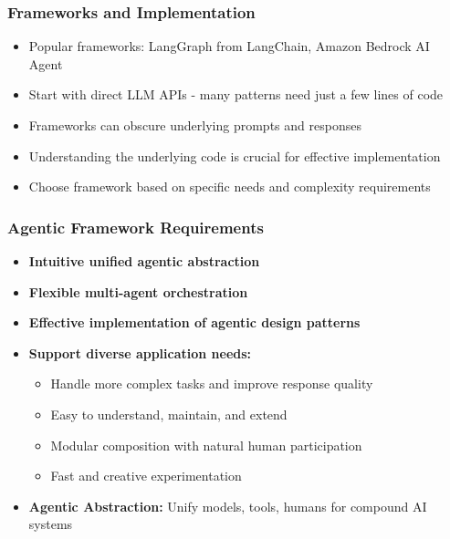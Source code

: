 \begin{frame}[fragile]\frametitle{Frameworks and Implementation}
\begin{itemize}
    \item Popular frameworks: LangGraph from LangChain, Amazon Bedrock AI Agent
    \item Start with direct LLM APIs - many patterns need just a few lines of code
    \item Frameworks can obscure underlying prompts and responses
    \item Understanding the underlying code is crucial for effective implementation
    \item Choose framework based on specific needs and complexity requirements
\end{itemize}
\end{frame}

\begin{frame}[fragile]\frametitle{Agentic Framework Requirements}
\begin{itemize}
    \item \textbf{Intuitive unified agentic abstraction}
    \item \textbf{Flexible multi-agent orchestration}
    \item \textbf{Effective implementation of agentic design patterns}
    \item \textbf{Support diverse application needs:}
    \begin{itemize}
        \item Handle more complex tasks and improve response quality
        \item Easy to understand, maintain, and extend
        \item Modular composition with natural human participation
        \item Fast and creative experimentation
    \end{itemize}
    \item \textbf{Agentic Abstraction:} Unify models, tools, humans for compound AI systems
\end{itemize}
\end{frame}

